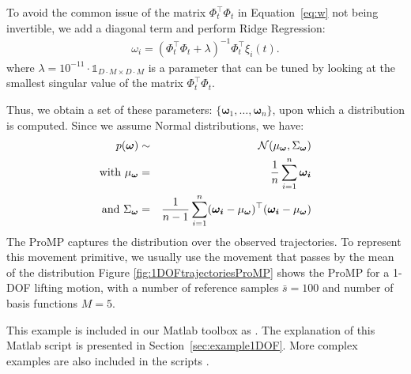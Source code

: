 \documentclass[utf8]{frontiersSCNS} %
\newcommand{\todo}[1]{\textcolor{red}{\textbf{/*#1*/}}}
\begin{document}
To avoid the common issue of the matrix $\Phi_t^\top\Phi_t$ in Equation~\ref{eq:w} not being invertible, we add a diagonal term and perform Ridge Regression:
\begin{eqnarray} \label{eq:wInvertible}
\omega_i = (\Phi_t^\top\Phi_t + \lambda)^{-1}\Phi_t^\top \xi_i(t).
\end{eqnarray} 
where $\lambda=10^{-11} \cdot \mathds{1}_{ D\cdot M \times D\cdot M} $ is a parameter that can be tuned by looking at the smallest singular value of the matrix $\Phi_t^\top\Phi_t$.


Thus, we obtain a set of these parameters: $\{\boldsymbol{\omega}_1,\ldots, \boldsymbol{\omega}_n\}$, upon which a distribution is computed. Since we assume Normal distributions, we have:
\begin{eqnarray}
p(\boldsymbol{\omega}) & \sim & \mathcal{N}(\mu_{\boldsymbol{\omega}}, \Sigma_{\boldsymbol{\omega}})\\
\mathrm{with }~\mu_{\boldsymbol{\omega}} & = & {1 \over n} \sum_{i=1}^n \boldsymbol{\omega_i} \\
\mathrm{and }~\Sigma_{\boldsymbol{\omega}} & = & {1 \over n-1} \sum_{i=1}^n (\boldsymbol{\omega_i} - \mu_{\boldsymbol{\omega}})^\top (\boldsymbol{\omega_i} - \mu_{\boldsymbol{\omega}})
\end{eqnarray}
The ProMP captures the distribution over the observed trajectories. {To represent this movement primitive, we usually use the movement that passes by the mean of the distribution} Figure \ref{fig:1DOFtrajectoriesProMP} shows the ProMP for a 1-DOF lifting motion, with a number of reference samples $\bar{s}=100$ and number of basis functions $M=5$. %

This example is included in our Matlab toolbox as . The explanation of this Matlab script is presented in Section~\ref{sec:example1DOF}. More complex examples are also included in the scripts .


\end{document}
